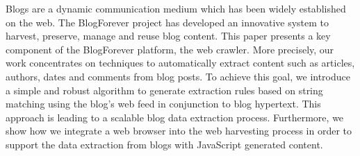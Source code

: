 Blogs are a dynamic communication medium which has been widely established on the web. The BlogForever project has developed an innovative system to harvest, preserve, manage and reuse blog content. This paper presents a key component of the BlogForever platform, the web crawler. More precisely, our work concentrates on techniques to automatically extract content such as articles, authors, dates and comments from blog posts. To achieve this goal, we introduce a simple and robust algorithm to generate extraction rules based on string matching using the blog's web feed in conjunction to blog hypertext. This approach is leading to a scalable blog data extraction process. Furthermore, we show how we integrate a web browser into the web harvesting process in order to support the data extraction from blogs with JavaScript generated content.
